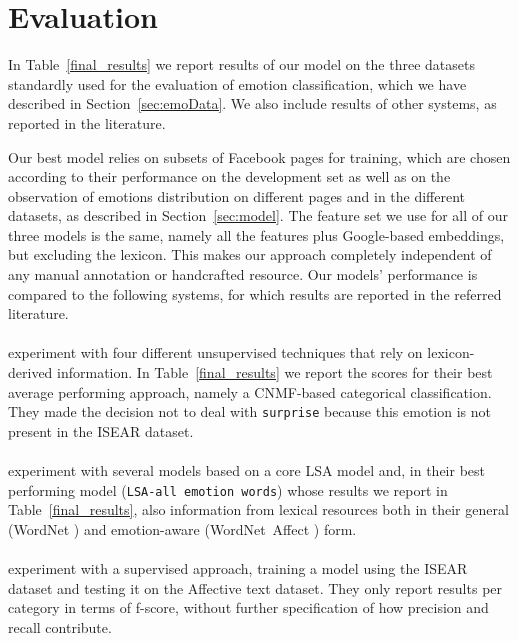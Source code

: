 \documentclass[11pt]{article}
\begin{document}


\section{Evaluation}
\label{sec:evaluation}
In Table~\ref{final_results} we report results of our model on the three datasets standardly used for the evaluation of emotion classification, which we have described in Section~\ref{sec:emoData}. We also include results of other systems, as reported in the literature. 

Our best model relies on subsets of Facebook pages for training, which are chosen according to their performance on the development set as well as on the observation of emotions distribution on different pages and in the different datasets, as described in Section~\ref{sec:model}. The feature set we use for all of our three models is the same, namely all the features plus Google-based embeddings, but excluding the lexicon. This makes our approach completely independent of any manual annotation or handcrafted resource. Our models' performance is compared to the following systems, for which results are reported in the referred literature. 


\paragraph{} experiment with four different unsupervised techniques that rely on lexicon-derived information. In Table~\ref{final_results} we report the scores for their best average performing approach, namely a CNMF-based categorical classification. They made the decision not to deal with \texttt{surprise} because this emotion is not present in the ISEAR dataset.


\paragraph{} experiment with several models based on a core LSA model and, in their best performing model (\texttt{LSA-all emotion words}) whose results we report in Table~\ref{final_results}, also information from lexical resources both in their general (WordNet \cite{wordnet}) and emotion-aware (WordNet~Affect \cite{strapparava2004wordnet}) form. 


\paragraph{} experiment with a supervised approach, training a model using the ISEAR dataset and testing it on the Affective text dataset. They only report results per category in terms of f-score, without further specification of how precision and recall contribute.
\end{document}
